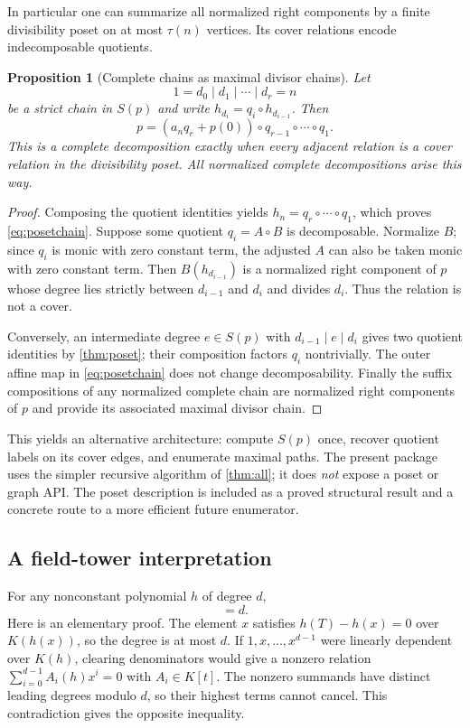 \documentclass[11pt,a4paper]{article}
\newtheorem{proposition}[theorem]{Proposition}
\theoremstyle{definition}
\begin{document}
In particular one can summarize all normalized right components by a finite divisibility poset on at most $\tau(n)$ vertices. Its cover relations encode indecomposable quotients.

\begin{proposition}[Complete chains as maximal divisor chains]\label{prop:maxchains}
Let
\[
 1=d_0\mid d_1\mid\cdots\mid d_r=n
\]
be a strict chain in $S(p)$ and write $h_{d_i}=q_i\circ h_{d_{i-1}}$. Then
\begin{equation}
 p=(a_nq_r+p(0))\circ q_{r-1}\circ\cdots\circ q_1.\label{eq:posetchain}
\end{equation}
This is a complete decomposition exactly when every adjacent relation is a cover relation in the divisibility poset. All normalized complete decompositions arise this way.
\end{proposition}
\begin{proof}
Composing the quotient identities yields $h_n=q_r\circ\cdots\circ q_1$, which proves \eqref{eq:posetchain}. Suppose some quotient $q_i=A\circ B$ is decomposable. Normalize $B$; since $q_i$ is monic with zero constant term, the adjusted $A$ can also be taken monic with zero constant term. Then $B(h_{d_{i-1}})$ is a normalized right component of $p$ whose degree lies strictly between $d_{i-1}$ and $d_i$ and divides $d_i$. Thus the relation is not a cover.

Conversely, an intermediate degree $e\in S(p)$ with $d_{i-1}\mid e\mid d_i$ gives two quotient identities by \cref{thm:poset}; their composition factors $q_i$ nontrivially. The outer affine map in \eqref{eq:posetchain} does not change decomposability. Finally the suffix compositions of any normalized complete chain are normalized right components of $p$ and provide its associated maximal divisor chain.
\end{proof}

This yields an alternative architecture: compute $S(p)$ once, recover quotient labels on its cover edges, and enumerate maximal paths. The present package uses the simpler recursive algorithm of \cref{thm:all}; it does \emph{not} expose a poset or graph API. The poset description is included as a proved structural result and a concrete route to a more efficient future enumerator.

\subsection{A field-tower interpretation}
For any nonconstant polynomial $h$ of degree $d$,
\begin{equation}
 [K(x):K(h(x))]=d.\label{eq:fielddegree}
\end{equation}
Here is an elementary proof. The element $x$ satisfies $h(T)-h(x)=0$ over $K(h(x))$, so the degree is at most $d$. If $1,x,\ldots,x^{d-1}$ were linearly dependent over $K(h)$, clearing denominators would give a nonzero relation $\sum_{i=0}^{d-1}A_i(h)x^i=0$ with $A_i\in K[t]$. The nonzero summands have distinct leading degrees modulo $d$, so their highest terms cannot cancel. This contradiction gives the opposite inequality.
\end{document}
